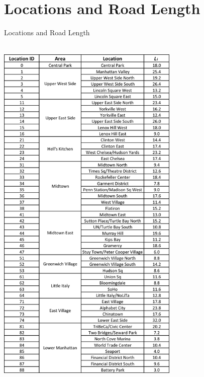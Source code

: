 \section{Locations and Road Length}


\begin{table}[h]
\centering
\caption{Locations and Road Length}\label{tab:location_id}\\
\vspace{0.2cm}
\includegraphics[width=8.7cm]{Tables/location_id.png}
\end{table}

\newpage